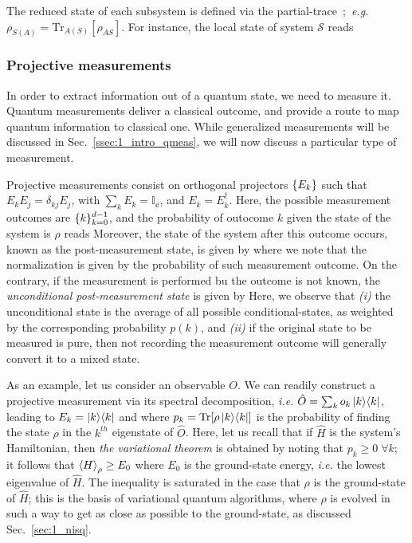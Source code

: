 The reduced state of each subsystem is defined via the partial-trace~\cite{nielsen00}; \textit{e.g.} $\rho_{S(A)} = \text{Tr}_{A(S)}\left[\rho_{AS}\right]$. For instance, the local state of system $\mathcal{S}$ reads

\subsubsection{Projective measurements}

In order to extract information out of a quantum state, we need to measure it. Quantum measurements deliver a classical outcome, and provide a route to map quantum information to classical one. While generalized measurements will be discussed in Sec.~\ref{ssec:1_intro_qmeas}, we will now discuss a particular type of measurement.

Projective measurements consist on orthogonal projectors $\lbrace E_k\rbrace$ such that $E_k E_j = \delta_{kj}E_j$, with $\sum_k E_k = \mathbb{I_d}$, and $E_k = E_k^\dagger$. Here, the possible measurement outcomes are $\lbrace k\rbrace_{k=0}^{d-1}$, and the probability of outocome $k$ given the state of the system is $\rho$ reads Moreover, the state of the system after this outcome occurs, known as the post-measurement state, is given by  where we note that the normalization is given by the probability of such measurement outcome. On the contrary, if the measurement is performed bu the outcome is not known, the \textit{unconditional post-measurement state} is given by Here, we observe that \textit{(i)} the unconditional state is the average of all possible conditional-states, as weighted by the corresponding probability $p(k)$, and \textit{(ii)} if the original state to be measured is pure, then not recording the measurement outcome will generally convert it to a mixed state.

As an example, let us consider an observable $O$. We can readily construct a projective measurement via its spectral decomposition, \textit{i.e.} $\hat{O} = \sum_k o_k \proj{k}$, leading to $E_k = \proj{k}$ and
where $p_k = \tr{\rho \proj{k}}$ is the probability of finding the state $\rho$ in the $k^{th}$ eigenstate of $\hat{O}$. Here, let us recall that if $\hat{H}$ is the system's Hamiltonian, then \textit{the variational theorem} is obtained by noting that $p_k\geq0 \;\forall k$; it follows that $\mathinner{\langle H\rangle}_\rho\geq E_0$ where $E_0$ is the ground-state energy, \textit{i.e.} the lowest eigenvalue of $\hat{H}$. The inequality is saturated in the case that $\rho$
is the ground-state of $\hat{H}$; this is the basis of variational quantum algorithms, where $\rho$ is evolved in such a way to get as close as possible to the ground-state, as discussed Sec.~\ref{sec:1_nisq}.

